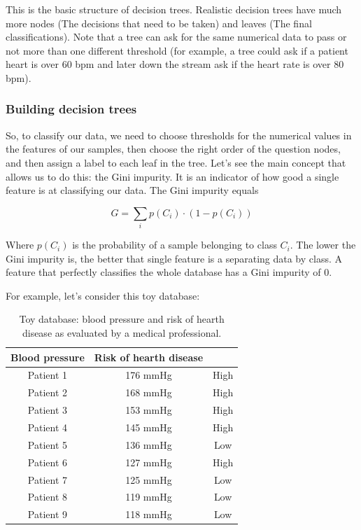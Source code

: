 \documentclass[a4paper]{report}
\begin{document}
This is the basic structure of decision trees.
Realistic decision trees have much more nodes (The decisions that need to be taken) and leaves (The final classifications).
Note that a tree can ask for the same numerical data to pass or not more than one different threshold (for example, a tree could ask if a patient heart is over 60 bpm and later down the stream ask if the heart rate is over 80 bpm).

\subsubsection{Building decision trees}

So, to classify our data, we need to choose thresholds for the numerical values in the features of our samples, then choose the right order of the question nodes, and then assign a label to each leaf in the tree.
Let's see the main concept that allows us to do this:
the Gini impurity.
It is an indicator of how good a single feature is at classifying our data.
The Gini impurity equals

\begin{equation}
    G = \sum_i p(C_i) \cdot (1 - p(C_i))
\end{equation}

Where $p(C_i)$ is the probability of a sample belonging to class $C_i$.
The lower the Gini impurity is, the better that single feature is a separating data by class.
A feature that perfectly classifies the whole database has a Gini impurity of 0.

For example, let's consider this toy database:

\begin{table}[H]
  \begin{center}
    \begin{tabular}{c|c|c} %
      \textbf{Blood pressure} & \textbf{Risk of hearth disease}\\
      \hline
      Patient 1 &  176 mmHg & High\\
      Patient 2 &  168 mmHg & High\\
      Patient 3 &  153 mmHg & High\\
      Patient 4 &  145 mmHg & High\\
      Patient 5 &  136 mmHg & Low\\
      Patient 6 &  127 mmHg & High\\
      Patient 7 &  125 mmHg & Low\\
      Patient 8 &  119 mmHg & Low\\
      Patient 9 &  118 mmHg & Low\\
    \end{tabular}
    \caption{Toy database: blood pressure and risk of hearth disease as evaluated by a medical professional.}
    \label{tree_table}
  \end{center}
\end{table}
\end{document}
